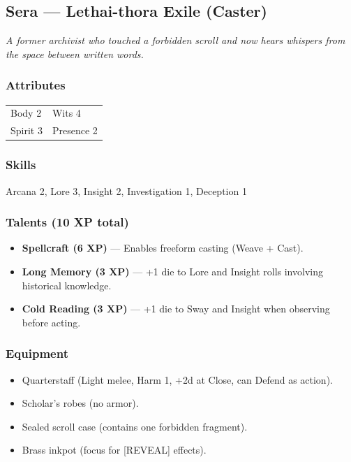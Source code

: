 \subsection{Sera --- Lethai-thora Exile (Caster)}

\textit{A former archivist who touched a forbidden scroll and now hears whispers from the space between written words.}

\subsubsection*{Attributes}
\begin{tabular}{@{}ll@{}}
Body 2 & Wits 4 \\
Spirit 3 & Presence 2 \\
\end{tabular}

\subsubsection*{Skills}
Arcana 2, Lore 3, Insight 2, Investigation 1, Deception 1

\subsubsection*{Talents (10 XP total)}
\begin{itemize}
  \item \textbf{Spellcraft (6 XP)} --- Enables freeform casting (Weave + Cast).
  \item \textbf{Long Memory (3 XP)} --- +1 die to Lore and Insight rolls involving historical knowledge.
  \item \textbf{Cold Reading (3 XP)} --- +1 die to Sway and Insight when observing before acting.
\end{itemize}

\subsubsection*{Equipment}
\begin{itemize}
  \item Quarterstaff (Light melee, Harm 1, +2d at Close, can Defend as action).
  \item Scholar's robes (no armor).
  \item Sealed scroll case (contains one forbidden fragment).
  \item Brass inkpot (focus for [REVEAL] effects).
\end{itemize}

